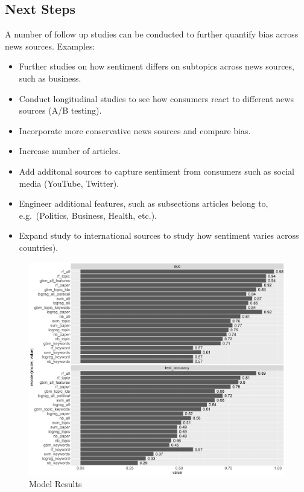 \documentclass[
]{article}
\begin{document}
\hypertarget{next-steps}{%
\subsection{Next Steps}\label{next-steps}}

A number of follow up studies can be conducted to further quantify bias
across news sources. Examples:

\begin{itemize}
\item
  Further studies on how sentiment differs on subtopics across news
  sources, such as business.
\item
  Conduct longitudinal studies to see how consumers react to different
  news sources (A/B testing).
\item
  Incorporate more conservative news sources and compare bias.
\item
  Increase number of articles.
\item
  Add additonal sources to capture sentiment from consumers such as
  social media (YouTube, Twitter).
\item
  Engineer additional features, such as subsections articles belong to,
  e.g.~(Politics, Business, Health, etc.).
\item
  Expand study to international sources to study how sentiment varies
  across countries).
\end{itemize}

\begin{figure}
\centering
\includegraphics{../figures/model_results.png}
\caption{Model Results}
\end{figure}
\end{document}
